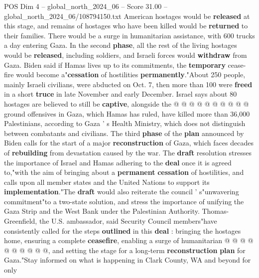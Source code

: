 \begin{textsample}{POS Dim 4 – global\_north\_2024\_06 – Score 31.00 – global\_north\_2024\_06/108794150.txt}
American hostages would be \textbf{released} at this stage, and remains of hostages who have been killed would be \textbf{returned} to their families.
There would be a surge in humanitarian assistance, with 600 trucks a day entering Gaza.
In the second \textbf{phase}, all the rest of the living hostages would be \textbf{released}, including soldiers, and Israeli forces would \textbf{withdraw} from Gaza.
Biden said if Hamas lives up to its commitments, the \textbf{temporary} cease-fire would become a"\textbf{cessation} of hostilities \textbf{permanently}."About 250 people, mainly Israeli civilians, were abducted on Oct. 7, then more than 100 were \textbf{freed} in a short \textbf{truce} in late November and early December.
Israel says about 80 hostages are believed to still be \textbf{captive}, alongside the @ @ @ @ @ @ @ @ @ @ ground offensives in Gaza, which Hamas has ruled, have killed more than 36,000 Palestinians, according to Gaza ' s Health Ministry, which does not distinguish between combatants and civilians.
The third \textbf{phase} of the \textbf{plan} announced by Biden calls for the start of a major \textbf{reconstruction} of Gaza, which faces decades of \textbf{rebuilding} from devastation caused by the war.
The \textbf{draft} resolution stresses the importance of Israel and Hamas adhering to the \textbf{deal} once it is agreed to,"with the aim of bringing about a \textbf{permanent} \textbf{cessation} of hostilities, and calls upon all member states and the United Nations to support its \textbf{implementation}."The \textbf{draft} would also reiterate the council ' s"unwavering commitment"to a two-state solution, and stress the importance of unifying the Gaza Strip and the West Bank under the Palestinian Authority.
Thomas-Greenfield, the U.S. ambassador, said Security Council members"have consistently called for the steps \textbf{outlined} in this \textbf{deal} : bringing the hostages home, ensuring a complete \textbf{ceasefire}, enabling a surge of humanitarian @ @ @ @ @ @ @ @ @ @, and setting the stage for a long-term \textbf{reconstruction} \textbf{plan} for Gaza."Stay informed on what is happening in Clark County, WA and beyond for only

\end{textsample}

